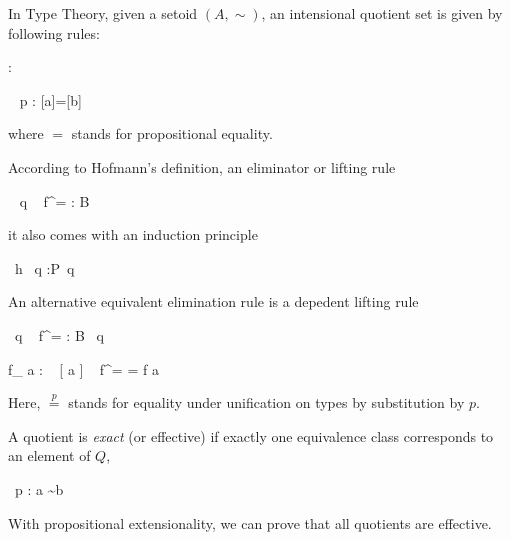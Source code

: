 In Type Theory, given a setoid $(A,\sim)$, an intensional quotient set is given by
following rules:

{ : \Set}


\begin{multicols}{2}
\columnbreak
{}
{ ~ p : [a]=[b]}
\end{multicols}

where $=$ stands for propositional equality.

According to Hofmann's\cite{hof:95:sm} definition, an eliminator or lifting rule


{ ~ q ~ f^{=} : B}



it also comes with an induction principle

{ ~h ~q :P~q}

An alternative equivalent elimination rule is a depedent lifting rule

{ ~q ~ f^= : B~ q}

{f_{\beta} a  :  ~ [ a ] ~ f^= = f a }

Here, $\stackrel{p}{=}$ stands for equality under unification on types by substitution by $p$.

A quotient is \emph{exact} (or effective) if exactly one equivalence class corresponds to
an element of $Q$,

{~{p} : a \sim b}


With propositional extensionality, we can prove that all quotients are effective.

